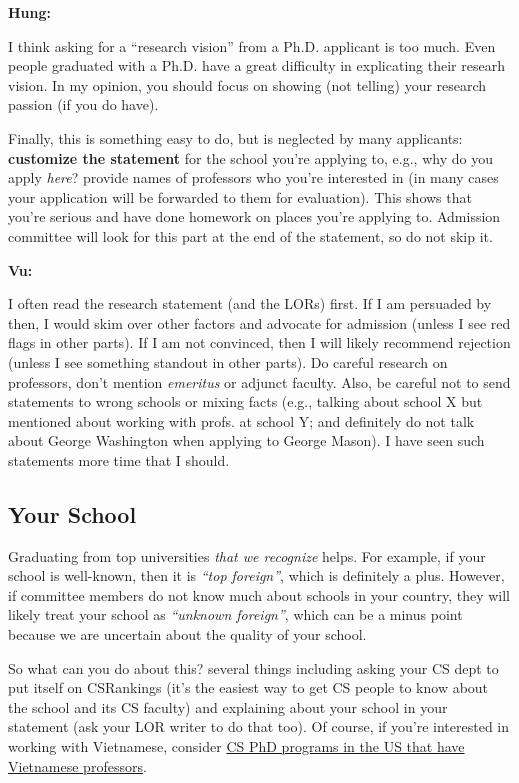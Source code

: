 \documentclass[11pt]{article}
\newenvironment{commentbox}[1][]{
\small
    \begin{cbox}
    \textbf{#1} 
 }{
   \end{cbox}
}
\begin{document}
\begin{commentbox}[Hung:]
I think asking for a “research vision” from a Ph.D. applicant is too much. Even people graduated with a Ph.D. have a great difficulty in explicating their researh vision. In my opinion, you should focus on showing (not telling) your research passion (if you do have).
\end{commentbox}

Finally, this is something easy to do, but is neglected by many
applicants: \textbf{customize the statement} for the school you're applying to,
e.g., why do you apply \emph{here}? provide names of professors who you're interested in (in many cases your application will be forwarded to them for evaluation).
This shows that you're serious and have done homework on places you're applying to.
Admission committee will look for this part at the end of the statement, so do not skip it.



\begin{commentbox}[Vu:]
I often read the research statement (and the LORs) first. If I am
persuaded by then, I would skim over other factors and advocate for
admission (unless I see red flags in other parts). If I am not
convinced, then I will likely recommend rejection (unless I see
something standout in other parts).
\tcblower
Do careful research on professors, don't mention \emph{emeritus} or  adjunct faculty. 
Also, be careful not to send statements to wrong schools or mixing
facts (e.g., talking about school X but mentioned about working with
profs. at school Y; and definitely do not talk about George Washington when applying to George Mason). I have seen such statements more time that I
should.
\end{commentbox}


\subsection{Your School}\label{sec:your-school}

Graduating from top universities \emph{that we recognize} helps. For example, if your school is well-known, then it is \emph{``top foreign''}, which is definitely a plus.
However, if committee members do not know much about schools in your country, they will likely treat your school as
\emph{``unknown foreign''}, which can be a minus point because we are uncertain about the quality of your school.


So what can you do about this? several things including asking your CS dept to put itself on CSRankings (it's the easiest way to get CS people to know about the school and its CS faculty)  and explaining about your school in your statement (ask your LOR writer to do that too). Of course, if you're interested in working with Vietnamese, consider  \href{https://github.com/dynaroars/dynaroars.github.io/wiki/Viet-CS-Profs-US}{CS PhD programs in the US that have Vietnamese professors}.
\end{document}

